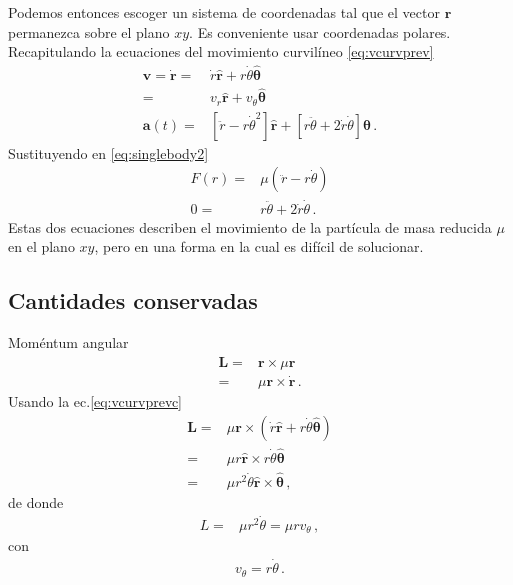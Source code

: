 Podemos entonces escoger un sistema de coordenadas tal que el vector $\mathbf{r}$ permanezca sobre el plano $xy$. Es conveniente usar coordenadas polares. 
Recapitulando la ecuaciones del movimiento curvilíneo \eqref{eq:vcurvprev}
\begin{align}
  \label{eq:vcurvprevc}
  \mathbf{v}=\dot{\mathbf{r}}=&\dot{r}\hat{\mathbf{r}}+
r\dot{\theta}\hat{\boldsymbol{\theta}}\nonumber\\
=&v_r\hat{\mathbf{r}}+v_\theta\hat{\boldsymbol{\theta}} \nonumber\\
  \mathbf{a}(t)=&%
[\ddot{r}-r\dot{\theta}^2]\hat{\mathbf{r}}
+[r\ddot{\theta}+2\dot{r}\dot{\theta}]\hat{\boldsymbol{\theta}}\,.
\end{align}
Sustituyendo en \eqref{eq:singlebody2}
\begin{align}
  F(r)=&\mu(\ddot{r}-r\dot{\theta})\nonumber\\
  0=&r\ddot{\theta}+2\dot{r}\dot{\theta}\,.
\end{align}
Estas dos ecuaciones describen el movimiento de la partícula de masa reducida $\mu$ en el plano $xy$, pero en una forma en la cual es difícil de solucionar. 

\subsection{Cantidades conservadas}

Moméntum angular
\begin{align}
  \mathbf{L}=&\mathbf{r}\times \mu\mathbf{r} \nonumber\\
  =&\mu \mathbf{r}\times \dot{\mathbf{r}}\,.
\end{align}
Usando la ec.\eqref{eq:vcurvprevc}
\begin{align}
  \mathbf{L}=&\mu\mathbf{r}\times(\dot{r}\hat{\mathbf{r}}+
r\dot{\theta}\hat{\boldsymbol{\theta}})\nonumber\\
=&\mu r\hat{\mathbf{r}}\times r\dot{\theta}\hat{\boldsymbol{\theta}}\nonumber\\
=&\mu r^2\dot{\theta}\hat{\mathbf{r}}\times\hat{\boldsymbol{\theta}}\,,
\end{align}
de donde
\begin{align}
  \label{eq:Lcte}
  L=&\mu r^2 \dot{\theta}=\mu r v_\theta\,,
\end{align}
con
\begin{align}
  v_\theta=r \dot{\theta}\,.
\end{align}

